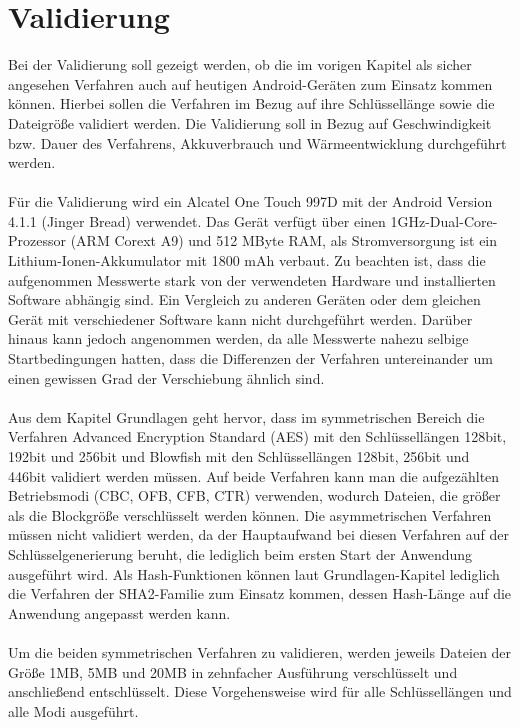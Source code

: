 \documentclass[10pt, a4paper,headsepline]{scrreprt}
\begin{document}
\chapter{Validierung}
Bei der Validierung soll gezeigt werden, ob die im vorigen Kapitel als sicher angesehen Verfahren auch auf heutigen Android-Geräten zum Einsatz kommen können. Hierbei sollen die Verfahren im Bezug auf ihre Schlüssellänge sowie die Dateigröße validiert werden. Die Validierung soll in Bezug auf Geschwindigkeit bzw. Dauer des Verfahrens, Akkuverbrauch und Wärmeentwicklung durchgeführt werden.  \\ \\
Für die Validierung wird ein Alcatel One Touch 997D mit der Android Version 4.1.1 (Jinger Bread) verwendet. Das Gerät verfügt über einen 1GHz-Dual-Core-Prozessor (ARM Corext A9) und 512 MByte RAM, als Stromversorgung ist ein Lithium-Ionen-Akkumulator mit 1800 mAh verbaut. Zu  beachten ist, dass die aufgenommen Messwerte stark von der verwendeten Hardware und installierten Software abhängig sind. Ein Vergleich zu anderen Geräten oder dem gleichen Gerät mit verschiedener Software kann nicht durchgeführt werden. Darüber hinaus kann jedoch angenommen werden, da alle Messwerte nahezu selbige Startbedingungen hatten, dass die Differenzen der Verfahren untereinander um einen gewissen Grad der Verschiebung ähnlich sind.\\ \\
Aus dem Kapitel Grundlagen geht hervor, dass im symmetrischen Bereich die Verfahren Advanced Encryption Standard (AES) mit den Schlüssellängen 128bit, 192bit und 256bit und Blowfish mit den Schlüssellängen 128bit, 256bit und 446bit validiert werden müssen. Auf beide Verfahren kann man die aufgezählten Betriebsmodi (CBC, OFB, CFB, CTR) verwenden, wodurch Dateien, die größer als die Blockgröße verschlüsselt werden können. Die asymmetrischen Verfahren müssen nicht validiert werden, da der Hauptaufwand bei diesen Verfahren auf der Schlüsselgenerierung beruht, die lediglich beim ersten Start der Anwendung ausgeführt wird. Als Hash-Funktionen können laut Grundlagen-Kapitel lediglich die Verfahren der SHA2-Familie zum Einsatz kommen, dessen Hash-Länge auf die Anwendung angepasst werden kann. \\ \\
Um die beiden symmetrischen Verfahren zu validieren, werden jeweils Dateien der Größe 1MB, 5MB und 20MB in zehnfacher Ausführung verschlüsselt und anschließend entschlüsselt. Diese Vorgehensweise wird für alle Schlüssellängen und alle Modi ausgeführt. \\
\end{document}
